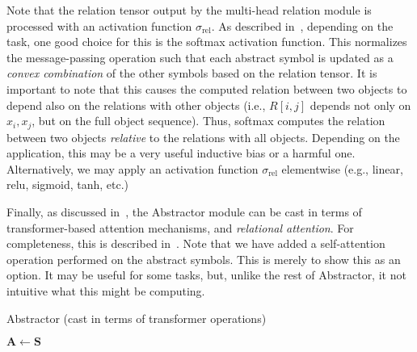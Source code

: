 Note that the relation tensor output by the multi-head relation module is processed with an activation function $\sigma_{\mathrm{rel}}$. As described in~, depending on the task, one good choice for this is the softmax activation function. This normalizes the message-passing operation such that each abstract symbol is updated as a \textit{convex combination} of the other symbols based on the relation tensor. It is important to note that this causes the computed relation between two objects to depend also on the relations with other objects (i.e., $R[i,j]$ depends not only on $x_i, x_j$, but on the full object sequence). Thus, softmax computes the relation between two objects \textit{relative} to the relations with all objects. Depending on the application, this may be a very useful inductive bias or a harmful one. Alternatively, we may apply an activation function $\sigma_{\mathrm{rel}}$ elementwise (e.g., linear, relu, sigmoid, tanh, etc.)

Finally, as discussed in~, the Abstractor module can be cast in terms of transformer-based attention mechanisms, and \textit{relational attention}. For completeness, this is described in~. Note that we have added a self-attention operation performed on the abstract symbols. This is merely to show this as an option. It may be useful for some tasks, but, unlike the rest of Abstractor, it not intuitive what this might be computing.

\begin{algorithm}[th!]
    \caption{Abstractor (cast in terms of transformer operations)}\label{alg:relational_abstractor}


    \vspace{1em}

    $\bm{A} \gets \bm{S}$

\end{algorithm}